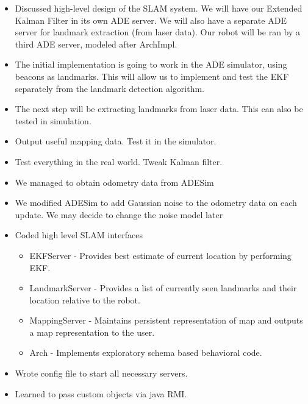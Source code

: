 \documentclass[12pt]{article}
\begin{document}
\begin{itemize}
    \setlength{\itemsep}{0pt}
    \setlength{\parskip}{0pt}
    \setlength{\parsep}{0pt}
    \item Discussed high-level design of the SLAM system. We will have our
          Extended Kalman Filter in its own ADE server. We will also have a
          separate ADE server for landmark extraction (from laser data). Our
          robot will be ran by a third ADE server, modeled after ArchImpl.
\end{itemize}

\begin{itemize}
    \setlength{\itemsep}{0pt}
    \setlength{\parskip}{0pt}
    \setlength{\parsep}{0pt}
    \item The initial implementation is going to work in the ADE simulator,
          using beacons as landmarks. This will allow us to implement and test
          the EKF separately from the landmark detection algorithm.
    \item The next step will be extracting landmarks from laser data. This can
          also be tested in simulation.
    \item Output useful mapping data. Test it in the simulator.
    \item Test everything in the real world. Tweak Kalman filter.
\end{itemize}

\begin{itemize}
    \setlength{\itemsep}{0pt}
    \setlength{\parskip}{0pt}
    \setlength{\parsep}{0pt}
    \item We managed to obtain odometry data from ADESim
    \item We modified ADESim to add Gaussian noise to the odometry data on each
          update. We may decide to change the noise model later
\end{itemize}

\begin{itemize}
    \setlength{\itemsep}{0pt}
    \setlength{\parskip}{0pt}
    \setlength{\parsep}{0pt}
  \item Coded high level SLAM interfaces
      \begin{itemize}
          \item EKFServer - Provides best estimate of current location by
            performing EKF.
          \item LandmarkServer - Provides a list of currently seen landmarks
            and their location relative to the robot.
          \item MappingServer - Maintains persistent representation of map and
            outputs a map representation to the user.
          \item Arch - Implements exploratory schema based behavioral code.
      \end{itemize}
    \item Wrote config file to start all necessary servers.
    \item Learned to pass custom objects via java RMI.
\end{itemize}
\end{document}
